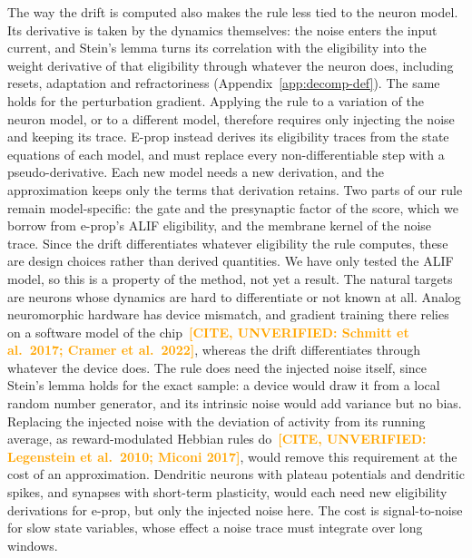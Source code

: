 \documentclass[10pt,twocolumn]{article}
\newcommand{\unverified}[1]{\textcolor{orange}{\bfseries[CITE, UNVERIFIED: #1]}}
\begin{document}
The way the drift is computed also makes the rule less tied to the neuron model. Its
derivative is taken by the dynamics themselves: the noise enters the input current, and
Stein's lemma turns its correlation with the eligibility into the weight derivative of
that eligibility through whatever the neuron does, including resets, adaptation and
refractoriness (Appendix~\ref{app:decomp-def}). The same holds for the perturbation
gradient. Applying the rule to a variation of the neuron model, or to a different model,
therefore requires only injecting the noise and keeping its trace. E-prop instead
derives its eligibility traces from the state equations of each model, and must replace
every non-differentiable step with a pseudo-derivative. Each new model needs a new
derivation, and the approximation keeps only the terms that derivation retains. Two parts
of our rule remain model-specific: the gate and the presynaptic factor of the score,
which we borrow from e-prop's ALIF eligibility, and the membrane kernel of the noise
trace. Since the drift differentiates whatever eligibility the rule computes, these are
design choices rather than derived quantities. We have only tested the ALIF model, so
this is a property of the method, not yet a result. The natural targets are neurons whose
dynamics are hard to differentiate or not known at all. Analog neuromorphic hardware has
device mismatch, and gradient training there relies on a software model of the
chip~\unverified{Schmitt et al.\ 2017; Cramer et al.\ 2022}, whereas the drift
differentiates through whatever the device does. The rule does need the injected noise
itself, since Stein's lemma holds for the exact sample: a device would draw it from a
local random number generator, and its intrinsic noise would add variance but no bias.
Replacing the injected noise with the deviation of activity from its running average, as
reward-modulated Hebbian rules do~\unverified{Legenstein et al.\ 2010; Miconi 2017},
would remove this requirement at the cost of an approximation. Dendritic neurons with plateau
potentials and dendritic spikes, and synapses with short-term plasticity, would each need
new eligibility derivations for e-prop, but only the injected noise here. The cost is
signal-to-noise for slow state variables, whose effect a noise trace must integrate over
long windows.
\end{document}
